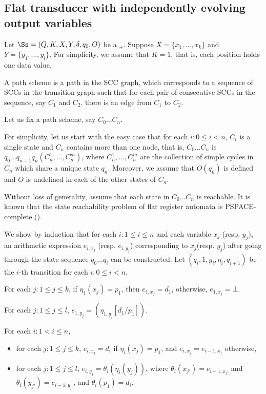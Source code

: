 


\subsection{Flat transducer with independently evolving output variables}

Let $\Ss=(Q, K, X, Y, \delta, q_0, O)$ be a \SDSIT$_{\pm}$. Suppose $X=\{x_1,\dots,x_k\}$ and $Y=\{y_1,\dots,y_l\}$. For simplicity, we assume that $K = 1$, that is, each position holds one data value.

A path scheme is a path in the SCC graph, which corresponds to a sequence of SCCs in the transition graph such that for each pair of consecutive SCCs in the sequence, say $C_1$ and $C_2$, there is an edge from $C_1$ to $C_2$.

Let us fix a path scheme, say $C_0 \dots C_n$.

For simplicity, let us start with the easy case that for each $i: 0 \le i < n$, $C_i$ is a single state and $C_n$ contains more than one node, that is, $C_0 \dots C_n$ is $q_0 \dots q_{n-1} q_n (C^1_n,\dots,C^m_n)$, where $C^1_{n},\dots, C^m_n$ are the collection of simple cycles in $C_n$ which share a unique state $q_{n}$. Moreover, we assume that $O(q_n)$ is defined and $O$ is undefined in each of the other states of $C_n$.

Without loss of generality, assume that each state in $C_0 \dots C_n$ is reachable. It is known that the state reachability problem of flat register automata is PSPACE-complete (\cite{DL09}). 


We show by induction that for each $i: 1 \le i \le n$ and each variable $x_j$ (resp. $y_j$), an arithmetic expression $e_{i,x_j}$ (resp. $e_{i,y_j}$) corresponding to $x_j$(resp. $y_j$) after going through the state sequence $q_0 \dots q_i$ can be constructed. Let $(q_{i}, 1, g_{i}, \eta_{i}, q_{i+1})$ be the $i$-th transition for each $i: 0 \le i < n$.

For each $j: 1 \le j \le k$, if $\eta_1(x_j)=p_1$, then $e_{1,x_j}=d_1$, otherwise, $e_{1,x_j}=\bot$.

For each $j: 1 \le j \le l$, $e_{1,y_j} = (\eta_{1,y_j}[d_1/p_1])$. 

For each $i: 1 < i \le n$, 
\begin{itemize}
\item for each $j: 1 \le j \le k$, $e_{i,x_j}=d_i$ if $\eta_i(x_j)=p_1$, and $e_{i,x_j}=e_{i-1,x_j}$ otherwise,
%
\item for each $j: 1 \le j \le l$, $e_{i,y_j} = \theta_i(\eta_i(y_j))$, where $\theta_i(x_{j'})=e_{i-1,x_{j'}}$ and $\theta_i(y_{j'})=e_{i-1, y_{j'}}$, and $\theta_i(p_1)=d_i$.
\end{itemize}

